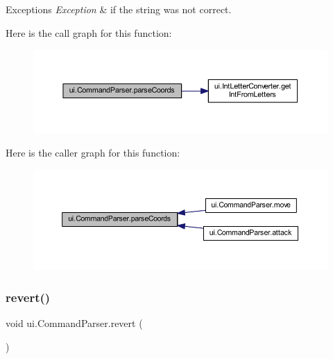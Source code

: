 \begin{DoxyExceptions}{Exceptions}
{\em Exception} & if the string was not correct. \\
\hline
\end{DoxyExceptions}
Here is the call graph for this function\+:
\nopagebreak
\begin{figure}[H]
\begin{center}
\leavevmode
\includegraphics[width=350pt]{classui_1_1_command_parser_a6fe407cb1b5f88c583f4797de79fd98f_cgraph}
\end{center}
\end{figure}
Here is the caller graph for this function\+:
\nopagebreak
\begin{figure}[H]
\begin{center}
\leavevmode
\includegraphics[width=350pt]{classui_1_1_command_parser_a6fe407cb1b5f88c583f4797de79fd98f_icgraph}
\end{center}
\end{figure}
\mbox{\label{classui_1_1_command_parser_a77911ad72c45c288bdf7a3c7c096ab07}} 
\subsubsection{\texorpdfstring{revert()}{revert()}}
{\footnotesize\ttfamily void ui.\+Command\+Parser.\+revert (\begin{DoxyParamCaption}{ }\end{DoxyParamCaption})\hspace{0.3cm}{\ttfamily [inline]}}

